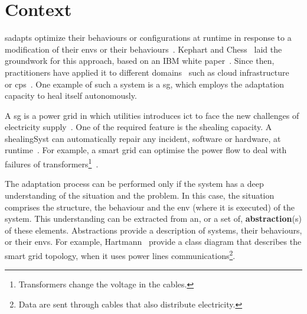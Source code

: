 \section{Context}

\Glspl{sadapt} optimize their \glspl{behaviour} or configurations at runtime in response to a modification of their \glspl{env} or their \glspl{behaviour}~\cite{DBLP:conf/dagstuhl/ChengLGIMABBBCSDFGGGKKKLMMMPSTTWW09}.
Kephart and Chess~\cite{DBLP:journals/computer/KephartC03} laid the groundwork for this approach, based on an IBM white paper~\cite{computing2006architectural}.
Since then, practitioners have applied it to different domains~\cite{DBLP:journals/corr/abs-1904-01518} such as cloud infrastructure~\cite{DBLP:conf/icac/JavadiG17, OpenStack:Watcher:Wiki, DBLP:conf/icse/BarnaKFL17} or \gls{cps}~\cite{DBLP:conf/icac/LalandaGC17, DBLP:conf/cbse/FouquetMFBPJ12, DBLP:conf/smartgridsec/0001FKNT14}.
One example of such a system is a \gls{sg}, which employs the adaptation capacity to heal itself autonomously.

A \gls{sg} is a power grid in which utilities introduces \gls{ict} to face the new challenges of electricity supply~\cite{farhangi2010path, ipakchi2009grid, DBLP:journals/comsur/FangMXY12}.
One of the required feature is the \gls{shealing} capacity.
A \gls{shealingSyst} can automatically repair any incident, software or hardware, at runtime~\cite{DBLP:journals/computer/KephartC03}.
For example, a smart grid can optimise the power flow to deal with failures of transformers\footnote{Transformers change the voltage in the cables.}~\cite{DBLP:journals/comsur/FangMXY12}.

The adaptation process can be performed only if the system has a deep understanding of the situation and the problem.
In this case, the situation comprises the \gls{structure}, the \gls{behaviour} and the \gls{env} (where it is executed) of the system.
This understanding can be extracted from an, or a set of, \textbf{abstraction}(s) of these elements.
Abstractions provide a description of systems, their \glspl{behaviour}, or their \glspl{env}.
For example, Hartmann~\etal \cite{DBLP:conf/smartgridcomm/0001FKTPTR14} provide a class diagram that describes the smart grid topology, when it uses power lines communications\footnote{Data are sent through cables that also distribute electricity.}.


